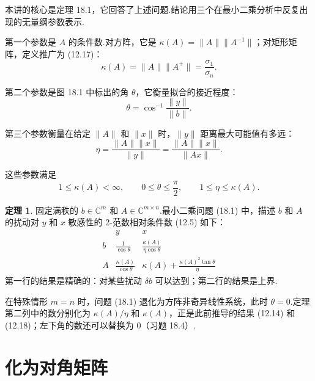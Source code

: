 \documentclass[UTF8,fontset=none,12pt]{ctexart}
\newcommand{\C}{\mathbb{C}}
\theoremstyle{definition}
\newtheorem{theorem}{定理}
\begin{document}
本讲的核心是定理 18.1，它回答了上述问题.结论用三个在最小二乘分析中反复出现的无量纲参数表示.

第一个参数是 $A$ 的条件数.对方阵，它是 $\kappa(A)=\|A\|\|A^{-1}\|$；对矩形矩阵，定义推广为 (12.17)：
\begin{equation}
    \kappa(A)=\|A\|\|A^+\|=\frac{\sigma_1}{\sigma_n}.
    \tag{18.3}
\end{equation}

第二个参数是图 18.1 中标出的角 $\theta$，它衡量拟合的接近程度：
\begin{equation}
    \theta=\cos^{-1}\frac{\|y\|}{\|b\|}.
    \tag{18.4}
\end{equation}

第三个参数衡量在给定 $\|A\|$ 和 $\|x\|$ 时，$\|y\|$ 距离最大可能值有多远：
\begin{equation}
    \eta=\frac{\|A\|\|x\|}{\|y\|}=\frac{\|A\|\|x\|}{\|Ax\|}.
    \tag{18.5}
\end{equation}

这些参数满足
\begin{equation}
    1\le\kappa(A)<\infty,\qquad 0\le\theta\le\frac{\pi}{2},\qquad 1\le\eta\le\kappa(A).
    \tag{18.6}
\end{equation}

\begin{theorem}
固定满秩的 $b\in\C^m$ 和 $A\in\C^{m\times n}$.最小二乘问题 (18.1) 中，描述 $b$ 和 $A$ 的扰动对 $y$ 和 $x$ 敏感性的 2-范数相对条件数 (12.5) 如下：
\[
\begin{array}{c|cc}
 & y & x\\
\hline
b & \displaystyle\frac{1}{\cos\theta}
  & \displaystyle\frac{\kappa(A)}{\eta\cos\theta}\\[10pt]
A & \displaystyle\frac{\kappa(A)}{\cos\theta}
  & \displaystyle\kappa(A)+\frac{\kappa(A)^2\tan\theta}{\eta}
\end{array}
\]
第一行的结果是精确的：对某些扰动 $\delta b$ 可以达到；第二行的结果是上界.
\end{theorem}

在特殊情形 $m=n$ 时，问题 (18.1) 退化为方阵非奇异线性系统，此时 $\theta=0$.定理第二列中的数分别化为 $\kappa(A)/\eta$ 和 $\kappa(A)$，正是此前推导的结果 (12.14) 和 (12.18)；左下角的数还可以替换为 0（习题 18.4）.

\section*{化为对角矩阵}
\end{document}
